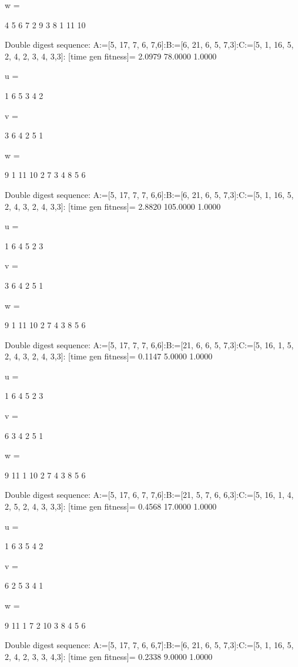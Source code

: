 w =

     4     5     6     7     2     9     3     8     1    11    10

Double digest sequence:
A:=[5, 17, 7, 6, 7,6]:B:=[6, 21, 6, 5, 7,3]:C:=[5, 1, 16, 5, 2, 4, 2, 3, 4, 3,3]:
[time gen fitness]=
    2.0979   78.0000    1.0000


u =

     1     6     5     3     4     2


v =

     3     6     4     2     5     1


w =

     9     1    11    10     2     7     3     4     8     5     6

Double digest sequence:
A:=[5, 17, 7, 7, 6,6]:B:=[6, 21, 6, 5, 7,3]:C:=[5, 1, 16, 5, 2, 4, 3, 2, 4, 3,3]:
[time gen fitness]=
    2.8820  105.0000    1.0000


u =

     1     6     4     5     2     3


v =

     3     6     4     2     5     1


w =

     9     1    11    10     2     7     4     3     8     5     6

Double digest sequence:
A:=[5, 17, 7, 7, 6,6]:B:=[21, 6, 6, 5, 7,3]:C:=[5, 16, 1, 5, 2, 4, 3, 2, 4, 3,3]:
[time gen fitness]=
    0.1147    5.0000    1.0000


u =

     1     6     4     5     2     3


v =

     6     3     4     2     5     1


w =

     9    11     1    10     2     7     4     3     8     5     6

Double digest sequence:
A:=[5, 17, 6, 7, 7,6]:B:=[21, 5, 7, 6, 6,3]:C:=[5, 16, 1, 4, 2, 5, 2, 4, 3, 3,3]:
[time gen fitness]=
    0.4568   17.0000    1.0000


u =

     1     6     3     5     4     2


v =

     6     2     5     3     4     1


w =

     9    11     1     7     2    10     3     8     4     5     6

Double digest sequence:
A:=[5, 17, 7, 6, 6,7]:B:=[6, 21, 6, 5, 7,3]:C:=[5, 1, 16, 5, 2, 4, 2, 3, 3, 4,3]:
[time gen fitness]=
    0.2338    9.0000    1.0000


